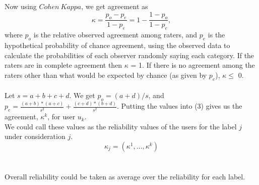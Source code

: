 \documentclass[twoside]{article}
\begin{document}
Now using \href{https://en.wikipedia.org/wiki/Cohen's\_kappa}{$Cohen\ Kappa$}, we get agreement as \\

\begin{equation}
    \kappa = \frac{p_o - p_e}{1 - p_e} = 1- \frac{1 - p_o}{1 - p_e}, \! 
\end{equation}
where $p_o$ is the relative observed agreement among raters, and $p_e$ is the hypothetical probability of chance agreement, using the observed data to calculate the probabilities of each observer randomly saying each category. If the raters are in complete agreement then $\kappa$ = 1. If there is no agreement among the raters other than what would be expected by chance (as given by $p_e$), $\kappa \leq$ 0.\\\\
Let $s=a+b+c+d$. We get $p_o=(a+d)/s$, and $p_e=\frac{(a+b)*(a+c)}{s^2}+\frac{(c+d)*(b+d)}{s^2}$. Putting the values into (3) gives us the agreement, $\kappa^k$, for user $u_k$. \\
We could call these values as the reliability values of the users for the label $j$ under consideration $j$. \\
\begin{equation}
  \kappa_j = (\kappa^1, ... , \kappa^k)
\end{equation}\\\\
Overall reliability could be taken as average over the reliability for each label.
\end{document}
